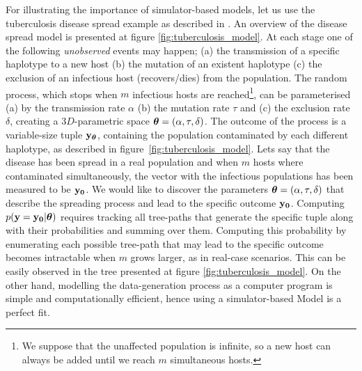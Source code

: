 For illustrating the importance of simulator-based models, let us use
the tuberculosis disease spread example as described in
\autocite{Tanaka2006}. An overview of the disease spread model is presented at figure
\ref{fig:tuberculosis_model}. At each stage one of the following
\textit{unobserved} events may happen; (a) the transmission of a
specific haplotype to a new host (b) the mutation of an existent
haplotype (c) the exclusion of an infectious host (recovers/dies) from the population. The
random process, which stops when $m$ infectious hosts are reached\footnote{We suppose that the unaffected population is infinite, so a new host can always be added until we reach $m$ simultaneous hosts.}, can
be parameterised (a) by the transmission rate $\alpha$ (b) the
mutation rate $\tau$ and (c) the exclusion rate $\delta$, creating a
$3D$-parametric space $\boldsymbol{\theta} = (\alpha, \tau, \delta)$. The outcome
of the process is a variable-size tuple $\mathbf{y}_{\boldsymbol{\theta}}$, containing the
population contaminated by each different haplotype, as described in
figure~\ref{fig:tuberculosis_model}. Lets say that the disease has been spread in a real population and when $m$ hosts where contaminated simultaneously, the vector with the infectious populations has been measured to be $\mathbf{y_0}$. We would like to discover the parameters $\boldsymbol{\theta} = (\alpha, \tau, \delta)$ that describe the spreading process and lead to the specific outcome $\mathbf{y_0}$. Computing $p(\mathbf{y}=\mathbf{y_0}|\boldsymbol{\theta})$
requires tracking all tree-paths that generate the specific tuple
along with their probabilities and summing over them. Computing this
probability by enumerating each possible tree-path that may lead to the specific outcome becomes intractable when $m$ grows larger, as in real-case
scenarios. This can be easily observed in the tree presented at figure \ref{fig:tuberculosis_model}. On the other hand, modelling the data-generation process as
a computer program is simple and computationally efficient, hence
using a simulator-based Model is a perfect fit.

